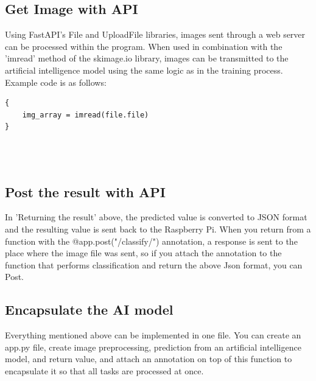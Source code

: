 \subsection{\textbf{Get Image with API}}
Using FastAPI's File and UploadFile libraries, images sent through a web server can be processed within the program. When used in combination with the 'imread' method of the skimage.io library, images can be transmitted to the artificial intelligence model using the same logic as in the training process. Example code is as follows:
\begin{verbatim}
{
    img_array = imread(file.file)
}
\end{verbatim}
\\
\\
\subsection{\textbf{Post the result with API}}
In 'Returning the result' above, the predicted value is converted to JSON format and the resulting value is sent back to the Raspberry Pi. When you return from a function with the @app.post("/classify/") annotation, a response is sent to the place where the image file was sent, so if you attach the annotation to the function that performs classification and return the above Json format, you can Post.\\

\subsection{\textbf{Encapsulate the AI model}}
Everything mentioned above can be implemented in one file. You can create an app.py file, create image preprocessing, prediction from an artificial intelligence model, and return value, and attach an annotation on top of this function to encapsulate it so that all tasks are processed at once.\\

